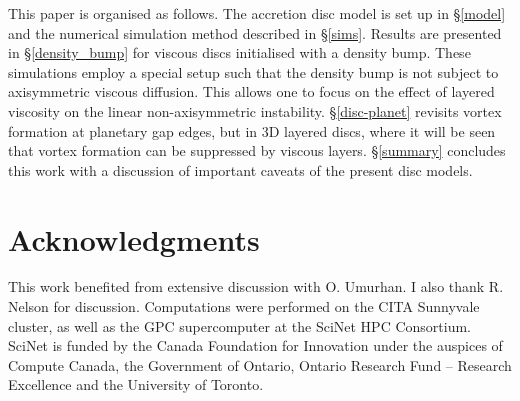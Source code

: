 \documentclass[useAMS,usenatbib]{mn2e}
\begin{document}
 
This paper is organised as follows. The accretion disc model is 
set up in \S\ref{model} and the numerical simulation method described
in \S\ref{sims}. Results are presented in \S\ref{density_bump} for 
viscous discs initialised with a density bump. These 
simulations employ a special setup such that the density bump is not
subject to axisymmetric viscous diffusion. This allows one to
focus on the effect of layered viscosity on the linear
non-axisymmetric instability. \S\ref{disc-planet} revisits vortex
formation at planetary gap edges, but in 3D layered discs, 
where it will be seen that vortex formation can be suppressed by
viscous layers. \S\ref{summary} concludes this work with a discussion
of important caveats of the present disc models.   







\section*{Acknowledgments}
This work benefited from extensive discussion with O. Umurhan. I also
thank R. Nelson for discussion. Computations were performed on the
CITA Sunnyvale cluster, as well as the GPC supercomputer at the SciNet
HPC Consortium. SciNet is funded by the Canada Foundation for
Innovation under the auspices of Compute Canada, the Government of
Ontario, Ontario Research Fund – Research Excellence and the
University of Toronto.   




%
%
\end{document}
